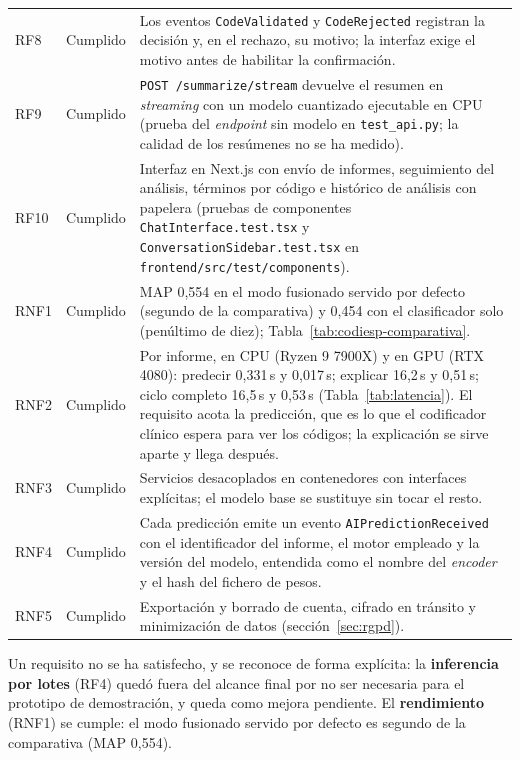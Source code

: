 {\begin{longtable}{llP{10.4cm}}
RF8 & Cumplido & Los eventos \texttt{CodeValidated} y \texttt{CodeRejected} registran la decisión y, en el rechazo, su motivo; la interfaz exige el motivo antes de habilitar la confirmación. \\
RF9 & Cumplido & \texttt{POST /summarize/stream} devuelve el resumen en \emph{streaming} con un modelo cuantizado ejecutable en CPU (prueba del \emph{endpoint} sin modelo en \texttt{test\_\allowbreak{}api.py}; la calidad de los resúmenes no se ha medido). \\
RF10 & Cumplido & Interfaz en Next.js con envío de informes, seguimiento del análisis, términos por código e histórico de análisis con papelera (pruebas de componentes \texttt{Chat\allowbreak{}Interface.\allowbreak{}test.\allowbreak{}tsx} y \texttt{Conversation\allowbreak{}Sidebar.\allowbreak{}test.\allowbreak{}tsx} en \texttt{frontend/\allowbreak{}src/\allowbreak{}test/\allowbreak{}components}). \\
\hline
RNF1 & Cumplido & MAP 0,554 en el modo fusionado servido por defecto (segundo de la comparativa) y 0,454 con el clasificador solo (penúltimo de diez); Tabla~\ref{tab:codiesp-comparativa}. \\
RNF2 & Cumplido & Por informe, en CPU (Ryzen 9 7900X) y en GPU (RTX 4080): predecir 0,331\,s y 0,017\,s; explicar 16,2\,s y 0,51\,s; ciclo completo 16,5\,s y 0,53\,s (Tabla~\ref{tab:latencia}). El requisito acota la predicción, que es lo que el codificador clínico espera para ver los códigos; la explicación se sirve aparte y llega después. \\
RNF3 & Cumplido & Servicios desacoplados en contenedores con interfaces explícitas; el modelo base se sustituye sin tocar el resto. \\
RNF4 & Cumplido & Cada predicción emite un evento \texttt{AIPredictionReceived} con el identificador del informe, el motor empleado y la versión del modelo, entendida como el nombre del \emph{encoder} y el hash del fichero de pesos. \\
RNF5 & Cumplido & Exportación y borrado de cuenta, cifrado en tránsito y minimización de datos (sección~\ref{sec:rgpd}). \\
\hline
\end{longtable}
}
Un requisito no se ha satisfecho, y se reconoce de forma explícita: la \textbf{inferencia por lotes} (RF4) quedó fuera del alcance final por no ser necesaria para el prototipo de demostración, y queda como mejora pendiente. El \textbf{rendimiento} (RNF1) se cumple: el modo fusionado servido por defecto es segundo de la comparativa (MAP 0,554).

